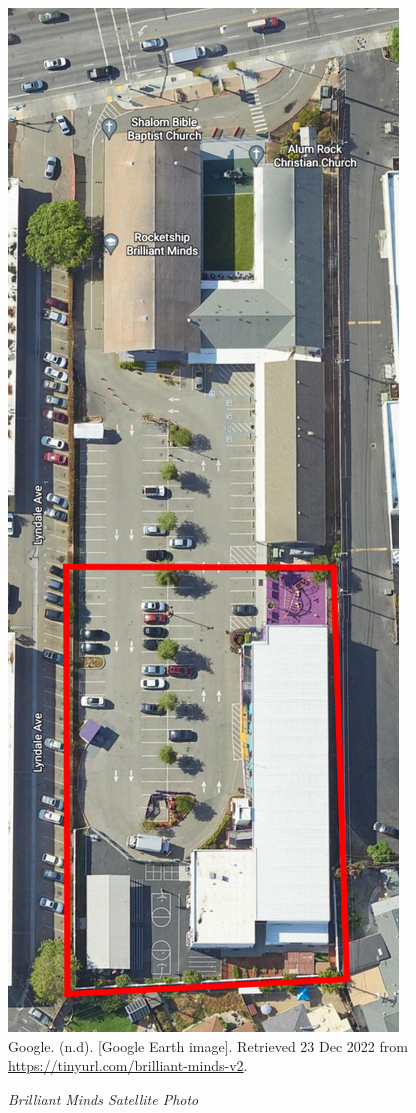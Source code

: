 \begin{figure}[hbtp]
  \centering
  \caption[Brilliant Minds Satellite Photo]{\textit{Brilliant Minds Satellite Photo}}\label{fig:brilliant-minds-sat-photo}
  \includegraphics[height=0.9\textheight]{Satellite-Photos/brilliant-minds-sat-photo}\\ %
  \footnotesize{Google. (n.d). [Google Earth image]. Retrieved 23 Dec 2022 from \url{https://tinyurl.com/brilliant-minds-v2}.}
\end{figure}


